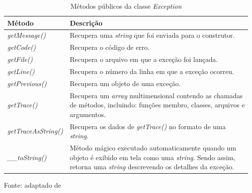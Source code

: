 \begin{table}[h!tb]
	\centering
	\setlength{\belowcaptionskip}{9pt}
	\caption{Métodos públicos da classe \textit{Exception}}
	\begin{tabular}{| l | p{} |}

		\hline
		\textbf{Método}
		& \textbf{Descrição} \\
		\hline

        \textit{getMessage()}
        & Recupera uma \textit{string} que foi enviada
        para o construtor.

        \\ \cline{1-2}
        \textit{getCode()}
        & Recupera o código de erro.
        \\ \cline{1-2}

        \textit{getFile()}
        & Recupera o arquivo em que a exceção foi lançada.
        \\ \cline{1-2}

        \textit{getLine()}
        & Recupera o número da linha em que a exceção ocorreu.
        \\ \cline{1-2}

        \textit{getPrevious()}
        & Recupera um objeto de uma exceção.
        \\ \cline{1-2}

        \textit{getTrace()}
        & Recupera um \textit{array} multimensional contendo as chamadas de
        métodos, incluindo: funções membro, classes, arquivos e argumentos. \\
        \cline{1-2}

        \textit{getTraceAsString()}
        & Recupera os dados de \textit{getTrace()} no formato de uma
        \textit{string}.
        \\ \cline{1-2}

        \textit{\_\_toString()}
        & Método mágico executado automaticamente quando um objeto é exibido em
        tela como uma \textit{string}. Sendo assim, retorna uma \textit{string}
        descrevendo os detalhes da exceção.
        \\
        \hline
	\end{tabular}
	\newline
	\newline
	\label{tab:excecao}
	\begin{footnotesize}
		Fonte: adaptado de \cite[p.53]{phpObjectsPatternsAndPractice}
	\end{footnotesize}
\end{table}

